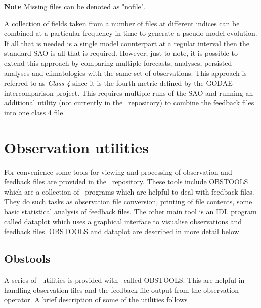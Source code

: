 \documentclass[../main/NEMO_manual]{subfiles}
\begin{document}
\textbf{Note} Missing files can be denoted as "nofile".

A collection of fields taken from a number of files at different indices can be combined at
a particular frequency in time to generate a pseudo model evolution.
If all that is needed is a single model counterpart at a regular interval then
the standard SAO is all that is required.
However, just to note, it is possible to extend this approach by comparing multiple forecasts, analyses, persisted analyses and
climatologies with the same set of observations.
This approach is referred to as \emph{Class 4} since it is the fourth metric defined by the GODAE intercomparison project. This requires multiple runs of the SAO and running an additional utility (not currently in the \NEMO\ repository) to combine the feedback files into one class 4 file.

\section{Observation utilities}
\label{sec:OBS_obsutils}

For convenience some tools for viewing and processing of observation and feedback files are provided in
the \NEMO\ repository.
These tools include OBSTOOLS which are a collection of \fortran\ programs which are helpful to deal with feedback files.
They do such tasks as observation file conversion, printing of file contents,
some basic statistical analysis of feedback files.
The other main tool is an IDL program called dataplot which uses a graphical interface to
visualise observations and feedback files.
OBSTOOLS and dataplot are described in more detail below.

\subsection{Obstools}

A series of \fortran\ utilities is provided with \NEMO\ called OBSTOOLS.
This are helpful in handling observation files and the feedback file output from the observation operator. A brief description of some of the utilities follows

\end{document}
